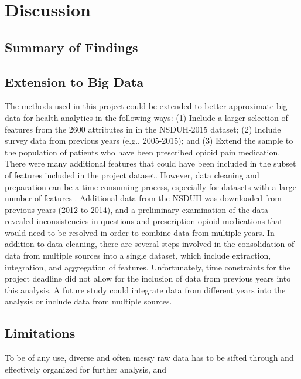 \documentclass[sigconf]{acmart}
\begin{document}
\section{Discussion}

\subsection{Summary of Findings}


\subsection{Extension to Big Data}

The methods used in this project could be extended to better approximate 
big data for health analytics in the following ways: (1) Include a larger 
selection of features from the 2600 attributes in in the NSDUH-2015 dataset; 
(2) Include survey data from previous years (e.g., 2005-2015); and (3) 
Extend the sample to the population of patients who have been prescribed 
opioid pain medication. There were many additional features that could have
been included in the subset of features included in the project dataset. 
However, data cleaning and preparation can be a time consuming process, 
especially for datasets with a large number of features \cite{rahm00}. 
Additional data from the NSDUH was downloaded from previous years (2012 to 
2014), and a preliminary examination of the data revealed inconsistencies 
in questions and prescription opioid medications that would need to be 
resolved in order to combine data from multiple years. In addition to data 
cleaning, there are several steps involved in the consolidation of data from 
multiple sources into a single dataset, which include extraction, integration, 
and aggregation of features. Unfortunately, time constraints for the project 
deadline did not allow for the inclusion of data from previous years into this 
analysis. A future study could integrate data from different years into the
analysis or include data from multiple sources. 


\subsection{Limitations}

To be of any use, diverse and often messy raw data has to be sifted through and 
effectively organized for further analysis, and 
\end{document}
